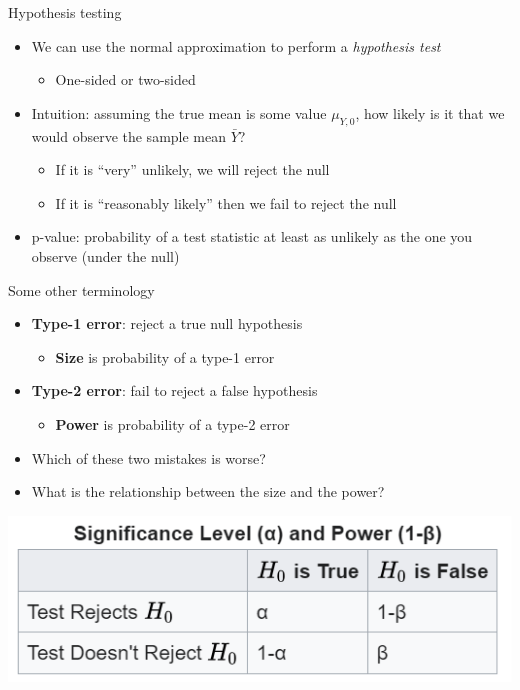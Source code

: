 \documentclass[aspectratio=169]{beamer}
\begin{document}
\begin{frame}{Hypothesis testing}
    \begin{itemize}
        \item We can use the normal approximation to perform a \textit{hypothesis test}
        \begin{itemize}
            \item One-sided or two-sided
        \end{itemize}
        \item Intuition: assuming the true mean is some value $\mu_{Y,0}$, how likely is it that we would observe the sample mean $\bar{Y}$?
        \begin{itemize}
            \item If it is ``very'' unlikely, we will reject the null
            \item If it is ``reasonably likely'' then we fail to reject the null
        \end{itemize}
        \item p-value: probability of a test statistic at least as unlikely as the one you observe (under the null)
    \end{itemize}
\end{frame}

\begin{frame}{Some other terminology}
    \begin{itemize}
        \item \textbf{Type-1 error}: reject a true null hypothesis
        \begin{itemize}
            \item \textbf{Size} is probability of a type-1 error
        \end{itemize}
        \item \textbf{Type-2 error}: fail to reject a false hypothesis
        \begin{itemize}
            \item \textbf{Power} is probability of a type-2 error
        \end{itemize}
        \item Which of these two mistakes is worse?
        \item What is the relationship between the size and the power?
    \end{itemize}
\end{frame}

\begin{frame}
    \centering
    \includegraphics[width = .6\textwidth,keepaspectratio]{size_and_power.png}
\end{frame}
\end{document}
